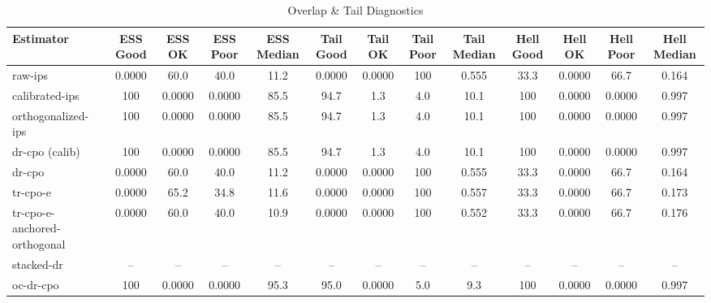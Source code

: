 \begin{table}[htbp]
\centering
\caption{Overlap & Tail Diagnostics}
\label{tab:A3}
\begin{tabular}{l|cccccccccccc}
\toprule
Estimator & ESS Good & ESS OK & ESS Poor & ESS Median & Tail Good & Tail OK & Tail Poor & Tail Median & Hell Good & Hell OK & Hell Poor & Hell Median \\
\midrule
raw-ips & 0.0000 & 60.0 & 40.0 & 11.2 & 0.0000 & 0.0000 & 100 & 0.555 & 33.3 & 0.0000 & 66.7 & 0.164 \\
calibrated-ips & 100 & 0.0000 & 0.0000 & 85.5 & 94.7 & 1.3 & 4.0 & 10.1 & 100 & 0.0000 & 0.0000 & 0.997 \\
orthogonalized-ips & 100 & 0.0000 & 0.0000 & 85.5 & 94.7 & 1.3 & 4.0 & 10.1 & 100 & 0.0000 & 0.0000 & 0.997 \\
dr-cpo (calib) & 100 & 0.0000 & 0.0000 & 85.5 & 94.7 & 1.3 & 4.0 & 10.1 & 100 & 0.0000 & 0.0000 & 0.997 \\
dr-cpo & 0.0000 & 60.0 & 40.0 & 11.2 & 0.0000 & 0.0000 & 100 & 0.555 & 33.3 & 0.0000 & 66.7 & 0.164 \\
tr-cpo-e & 0.0000 & 65.2 & 34.8 & 11.6 & 0.0000 & 0.0000 & 100 & 0.557 & 33.3 & 0.0000 & 66.7 & 0.173 \\
tr-cpo-e-anchored-orthogonal & 0.0000 & 60.0 & 40.0 & 10.9 & 0.0000 & 0.0000 & 100 & 0.552 & 33.3 & 0.0000 & 66.7 & 0.176 \\
stacked-dr & -- & -- & -- & -- & -- & -- & -- & -- & -- & -- & -- & -- \\
oc-dr-cpo & 100 & 0.0000 & 0.0000 & 95.3 & 95.0 & 0.0000 & 5.0 & 9.3 & 100 & 0.0000 & 0.0000 & 0.997 \\
\bottomrule
\end{tabular}
\end{table}